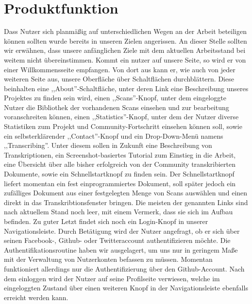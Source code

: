 \documentclass{article}
\begin{document}
\section{Produktfunktion}
Dass Nutzer sich planmäßig auf unterschiedlichen Wegen an der Arbeit beteiligen können sollten wurde bereits in unseren Zielen angerissen. An dieser Stelle sollten wir erwähnen, dass unsere anfänglichen Ziele mit dem aktuellen Arbeitsstand bei weitem nicht übereinstimmen.
Kommt ein nutzer auf unsere Seite, so wird er von einer Willkommensseite empfangen. Von dort aus kann er, wie auch von jeder weiteren Seite aus, unsere Oberfläche über Schaltflächen durchblättern. Diese beinhalten eine ,,About''-Schaltfläche, unter deren Link eine Beschreibung unseres Projektes zu finden sein wird, einen ,,Scans''-Knopf, unter dem eingeloggte Nutzer die Bibliothek der vorhandenen Scans einsehen und zur bearbeitung voranschreiten können, einen ,,Statistics''-Knopf, unter dem der Nutzer diverse Statistiken zum Projekt und Community-Fortschritt einsehen können soll, sowie ein selbsterklärender ,,Contact''-Knopf und ein Drop-Down-Menü namens ,,Transcribing''. Unter diesem sollen in Zukunft eine Beschreibung von Transkriptionen, ein Screenshot-basiertes Tutorial zum Einstieg in die Arbeit, eine Übersicht über alle bisher erfolgreich von der Community transkribierten Dokumente, sowie ein Schnellstartknopf zu finden sein. Der Schnellstartknopf liefert momentan ein fest einprogrammiertes Dokument, soll später jedoch ein zufälliges Dokument aus einer festgelegten Menge von Scans auswählen und einen direkt in das Transkribtionsfenster bringen. Die meisten der genannten Links sind nach aktuellem Stand noch leer, mit einem Vermerk, dass sie sich im Aufbau befinden. Zu guter Letzt findet sich noch ein Login-Knopf in unserer Navigationsleiste. Durch Betätigung wird der Nutzer angefragt, ob er sich über seinen Facebook-, Github- oder Twitteraccount authentifizieren möchte. Die Authentifikationsroutine haben wir ausgelagert, um uns nur in geringem Maße mit der Verwaltung von Nutzerkonten befassen zu müssen. Momentan funktioniert allerdings nur die Authentifizierung über den Github-Account. Nach dem einloggen wird der Nutzer auf seine Profilseite verwiesen, welche im eingeloggten Zustand über einen weiteren Knopf in der Navigationsleiste ebenfalls erreicht werden kann. \\
\end{document}
